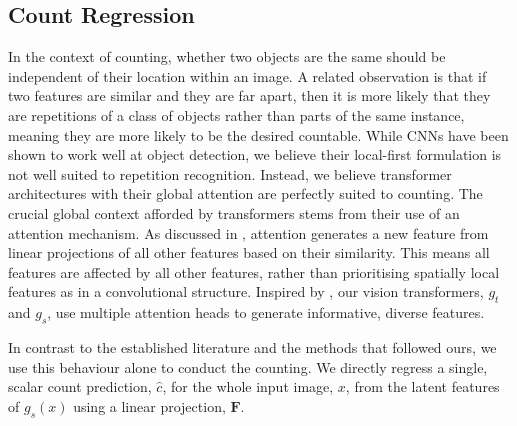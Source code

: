 \documentclass[../thesis.tex]{subfiles}
\begin{document}
\subsection{Count Regression}
In the context of counting, whether two objects are the same should be independent of their location within an image. 
A related observation is that if two features are similar and they are far apart, then it is more likely that they are repetitions of a class of objects rather than parts of the same instance, meaning they are more likely to be the desired countable.
While CNNs have been shown to work well at object detection, we believe their local-first formulation is not well suited to repetition recognition.
Instead, we believe transformer architectures with their global attention are perfectly suited to counting.
The crucial global context afforded by transformers stems from their use of an attention mechanism. As discussed in , attention generates a new feature from linear projections of all other features based on their similarity.
This means all features are affected by all other features, rather than prioritising spatially local features as in a convolutional structure.
Inspired by \citet{vaswani2017attention}, our vision transformers, $g_{t}$ and $g_{s}$, use multiple attention heads to generate informative, diverse features.

In contrast to the established literature and the methods that followed ours, we use this behaviour alone to conduct the counting. We directly regress a single, scalar count prediction, $\hat{c}$, for the whole input image, $x$, from the latent features of $g_s(x)$ using a linear projection, $\mathbf{F}$. 
\end{document}
